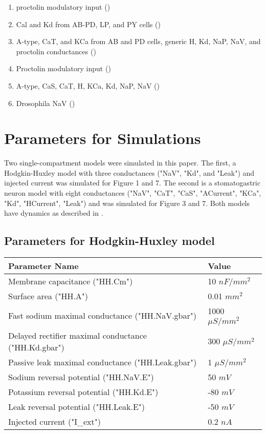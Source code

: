 \documentclass[utf8]{frontiers_suppmat} %
\begin{document}
\begin{enumerate}
		\item proctolin modulatory input (\cite{sharpDynamicClampComputergenerated1993})
		\item Cal and Kd from AB-PD, LP, and PY cells (\cite{soto-trevinoActivitydependentModificationInhibitory2001})
		\item A-type, CaT, and KCa from AB and PD cells, generic H, Kd, NaP, NaV, and proctolin conductances (\cite{soto-trevinoComputationalModelElectrically2005})
		\item Proctolin modulatory input (\cite{swensenModulatorsConvergentCellular2001})
		\item A-type, CaS, CaT, H, KCa, Kd, NaP, NaV (\cite{turrigianoSelectiveRegulationCurrent1995})
		\item Drosophila NaV (\cite{wicherNonsynapticIonChannels2001})
	\end{enumerate}

\section{Parameters for Simulations}

	Two single-compartment models were simulated in this paper. The first, a Hodgkin-Huxley model with three conductances ("NaV", "Kd", and "Leak") and injected current was simulated for Figure 1 and 7. The second is a stomatogastric neuron model with eight conductances ("NaV", "CaT", "CaS", "ACurrent", "KCa", "Kd", "HCurrent", "Leak") and was simulated for Figure 3 and 7. Both models have dynamics as described in \cite{liuModelNeuronActivityDependent1998}.
	
	\subsection{Parameters for Hodgkin-Huxley model} 
	
		\begin{center}
			\begin{tabular}{|l|l|}
				\hline 
				\textbf{Parameter Name} & \textbf{Value} \\ 
				\hline 
				Membrane capacitance ("HH.Cm") & 10 ${nF}/{mm^2}$ \\ 
				\hline 
				Surface area ("HH.A") & 0.01 $mm^2$ \\ 
				\hline 
				Fast sodium maximal conductance ("HH.NaV.gbar") & 1000 $\mu S/mm^2$ \\ 
				\hline 
				Delayed rectifier maximal conductance ("HH.Kd.gbar") & 300 $\mu S/mm^2$ \\ 
				\hline 
				Passive leak maximal conductance ("HH.Leak.gbar") & 1 $\mu S/mm^2$ \\ 
				\hline 
				Sodium reversal potential ("HH.NaV.E") & 50 $mV$ \\ 
				\hline 
				Potassium reversal potential ("HH.Kd.E") & -80 $mV$ \\ 
				\hline
				Leak reversal potential ("HH.Leak.E") & -50 $mV$ \\
				\hline
				Injected current ("I_ext") & 0.2 $nA$ \\
				\hline 
			\end{tabular} 
		\end{center}
	
\end{document}

